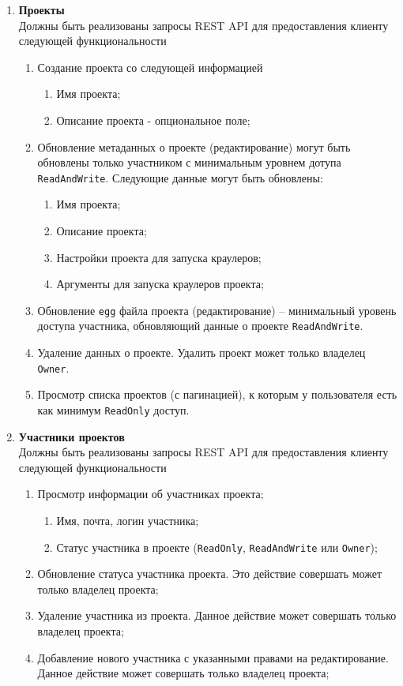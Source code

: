 \begin{enumerate}
		\item \textbf{Проекты\\}
		Должны быть реализованы запросы REST API для предоставления клиенту следующей функциональности
		\begin{enumerate}
	    	\item Создание проекта со следующей информацией
	    	\begin{enumerate}
	    	    \item Имя проекта;
	    	    \item Описание проекта - опциональное поле;
	    	\end{enumerate}
			\item Обновление метаданных о проекте (редактирование) могут быть обновлены только участником с минимальным уровнем дотупа \texttt{ReadAndWrite}. Следующие данные могут быть обновлены:
			\begin{enumerate}
			    \item Имя проекта;
			    \item Описание проекта;
			    \item Настройки проекта для запуска краулеров;
			    \item Аргументы для запуска краулеров проекта;
			\end{enumerate}
			\item Обновление \texttt{egg} файла проекта (редактирование) -- минимальный уровень доступа участника, обновляющий данные о проекте \texttt{ReadAndWrite}.  
			\item Удаление данных о проекте. Удалить проект может только владелец \texttt{Owner}.
			\item Просмотр списка проектов (с пагинацией), к которым у пользователя есть как минимум \texttt{ReadOnly} доступ.
		\end{enumerate}
		
		\item \textbf{Участники проектов\\}
		Должны быть реализованы запросы REST API для предоставления клиенту следующей функциональности
		\begin{enumerate}
	    	\item Просмотр информации об участниках проекта;
	    	\begin{enumerate}
	    	    \item Имя, почта, логин участника;
	    	    \item Статус участника в проекте (\texttt{ReadOnly}, \texttt{ReadAndWrite} или \texttt{Owner});
	    	\end{enumerate}
			\item Обновление статуса участника проекта. Это действие совершать может только владелец проекта; 
			\item Удаление участника из проекта. Данное действие может совершать только владелец проекта;
			\item Добавление нового участника с указанными правами на редактирование. Данное действие может совершать только владелец проекта;
		\end{enumerate}
		

\end{enumerate}
